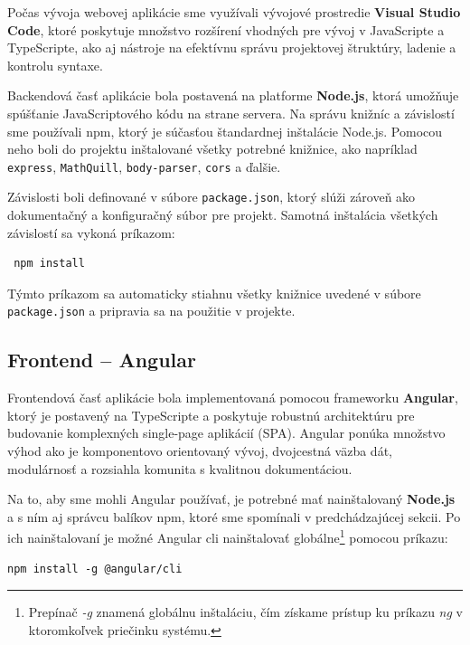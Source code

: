  Počas vývoja webovej aplikácie sme využívali vývojové prostredie \textbf{Visual Studio Code}\cite{vscode}, ktoré poskytuje množstvo rozšírení vhodných pre vývoj v JavaScripte a TypeScripte, ako aj nástroje na efektívnu správu projektovej štruktúry, ladenie a kontrolu syntaxe.
 
 Backendová časť aplikácie bola postavená na platforme \textbf{Node.js}, ktorá umožňuje spúšťanie JavaScriptového kódu na strane servera. Na správu knižníc a závislostí sme používali \acrfull{npm}, ktorý je súčasťou štandardnej inštalácie Node.js. 
 Pomocou neho boli do projektu inštalované všetky potrebné knižnice, ako napríklad \texttt{express}, \texttt{MathQuill}, \texttt{body-parser}, \texttt{cors} a ďalšie.
  
 Závislosti boli definované v súbore \texttt{package.json}, ktorý slúži zároveň ako dokumentačný a konfiguračný súbor pre projekt. Samotná inštalácia všetkých závislostí sa vykoná príkazom:
 
 \begin{verbatim}
 npm install
 \end{verbatim}
 
 Týmto príkazom sa automaticky stiahnu všetky knižnice uvedené v súbore \texttt{package.json} a pripravia sa na použitie v projekte.
 
 \subsection{Frontend – Angular }

Frontendová časť aplikácie bola implementovaná pomocou frameworku \textbf{Angular}, ktorý je postavený na TypeScripte a poskytuje robustnú architektúru pre budovanie komplexných single-page aplikácií (SPA).
 Angular ponúka množstvo výhod ako je komponentovo orientovaný vývoj, dvojcestná väzba dát, modulárnosť a rozsiahla komunita s kvalitnou dokumentáciou.

\bigskip
Na to, aby sme mohli Angular používať, je potrebné mať nainštalovaný \textbf{Node.js} a s ním aj správcu balíkov \acrshort{npm}, ktoré sme spomínali v predchádzajúcej sekcii. 
Po ich nainštalovaní je možné Angular \acrshort{cli} nainštalovať globálne\footnote{Prepínač \textit{-g} znamená globálnu inštaláciu, čím získame prístup ku príkazu \textit{ng} v ktoromkoľvek priečinku systému.}
pomocou príkazu:

\begin{verbatim}
npm install -g @angular/cli
\end{verbatim}

